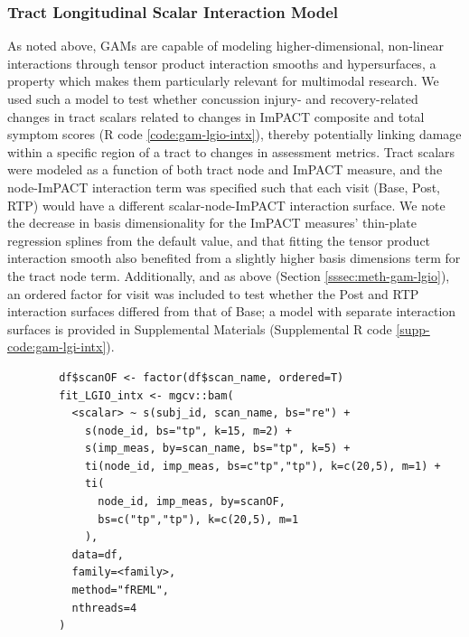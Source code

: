 \documentclass[12pt]{article}
\begin{document}
\subsubsection{Tract Longitudinal Scalar Interaction Model}
\label{sssec:meth-gam-lgio-intx}
As noted above, GAMs are capable of modeling higher-dimensional, non-linear interactions through tensor product interaction smooths and hypersurfaces, a property which makes them particularly relevant for multimodal research. We used such a model to test whether concussion injury- and recovery-related changes in tract scalars related to changes in ImPACT composite and total symptom scores (R code \ref{code:gam-lgio-intx}), thereby potentially linking damage within a specific region of a tract to changes in assessment metrics. Tract scalars were modeled as a function of both tract node and ImPACT measure, and the node-ImPACT interaction term was specified such that each visit (Base, Post, RTP) would have a different scalar-node-ImPACT interaction surface. We note the decrease in basis dimensionality for the ImPACT measures' thin-plate regression splines from the default value, and that fitting the tensor product interaction smooth also benefited from a slightly higher basis dimensions term for the tract node term. Additionally, and as above (Section \ref{sssec:meth-gam-lgio}), an ordered factor for visit was included to test whether the Post and RTP interaction surfaces differed from that of Base; a model with separate interaction surfaces is provided in Supplemental Materials (Supplemental R code \ref{supp-code:gam-lgi-intx}).

\begin{equ}[H]
	\begin{lstlisting}
		df$scanOF <- factor(df$scan_name, ordered=T)
		fit_LGIO_intx <- mgcv::bam(
		  <scalar> ~ s(subj_id, scan_name, bs="re") +
		    s(node_id, bs="tp", k=15, m=2) +
		    s(imp_meas, by=scan_name, bs="tp", k=5) +
		    ti(node_id, imp_meas, bs=c"tp","tp"), k=c(20,5), m=1) +
		    ti(
		      node_id, imp_meas, by=scanOF,
		      bs=c("tp","tp"), k=c(20,5), m=1
		    ),
		  data=df,
		  family=<family>,
		  method="fREML",
		  nthreads=4
		)
	\end{lstlisting}
	\caption{Tract scalars are modeled as a function of separate 1D node and ImPACT smooths as well as a 2D tensor product interaction surface, with ordered factors used to compare Post and RTP surfaces to Base. \lstinline{imp_meas} = ImPACT composite or total symptom measure.}
	\label{code:gam-lgio-intx}
\end{equ}
\end{document}
